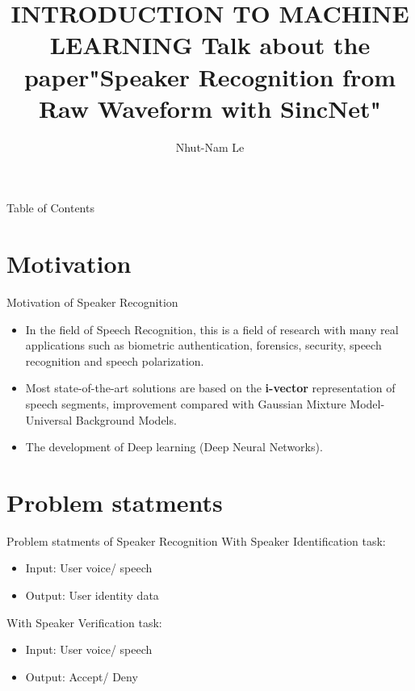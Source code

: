 \documentclass[11pt]{beamer}
\author{Nhut-Nam Le}
\title{INTRODUCTION TO MACHINE LEARNING \newline Talk about the paper"Speaker Recognition from Raw Waveform with SincNet"}
\institute{Department of Computer Science, University of Science, VNU}
\begin{document}
\begin{frame}
	\titlepage
\end{frame}

\begin{frame}{Table of Contents}
	\tableofcontents
\end{frame}

\section{Motivation}
\begin{frame}{Motivation of Speaker Recognition}
	\begin{itemize}
		\item In the field of Speech Recognition, this is a field of research with many real applications such as biometric authentication, forensics, security, speech recognition and speech polarization.
		\item Most state-of-the-art solutions are based on the \textbf{i-vector} representation of speech segments, improvement compared with Gaussian Mixture Model-Universal Background Models.
		\item The development of Deep learning (Deep Neural Networks).
	\end{itemize}
\end{frame}
\section{Problem statments}
\begin{frame}{Problem statments of Speaker Recognition}
	With Speaker Identification task:
	\begin{itemize}
		\item Input: User voice/ speech
		\item Output: User identity data
	\end{itemize}
	With Speaker Verification task:
	\begin{itemize}
		\item Input: User voice/ speech
		\item Output: Accept/ Deny
	\end{itemize}
\end{frame}
\end{document}

